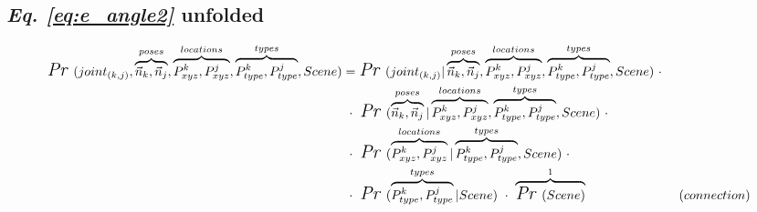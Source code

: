 \documentclass[11pt,a3paper]{article}
\newcommand{\pr}[1]{\textit{\Large Pr~}(#1)}
\let\oldeqref\eqref
\renewcommand{\eqref}[1]{ {\it Eq. \oldeqref{#1}} }
\begin{document}
\subsection*{\eqref{eq:e_angle2} unfolded}
\begin{align}
		\pr{ joint_{(k,j)},
			 \overbrace{\vec{n}_k,\vec{n}_j}^{poses},
		     \overbrace{P^k_{xyz},P^j_{xyz}}^{locations},
		   	 \overbrace{P^k_{type},P^j_{type}}^{types},Scene} &=
		\pr{ joint_{(k,j)} | 
			 \overbrace{\vec{n}_k,\vec{n}_j}^{poses},
		     \overbrace{P^k_{xyz},P^j_{xyz}}^{locations},
		   	 \overbrace{P^k_{type},P^j_{type}}^{types},Scene} ~\cdot~\notag\\
&~\cdot~\pr{\overbrace{\vec{n}_k,\vec{n}_j}^{poses} |
		     \overbrace{P^k_{xyz},P^j_{xyz}}^{locations},
		   	 \overbrace{P^k_{type},P^j_{type}}^{types},Scene} ~\cdot~\notag\\		   	 &~\cdot~\pr{ \overbrace{P^k_{xyz},P^j_{xyz}}^{locations} |
		   	 \overbrace{P^k_{type},P^j_{type}}^{types},Scene} ~\cdot~\notag\\
&~\cdot~\pr{ \overbrace{P^k_{type},P^j_{type}}^{types} |
			 Scene} ~\cdot~ 
			 \overbrace{\pr{Scene}}^1 &(connection)
%
%
\end{align}
\pagebreak
\end{document}
